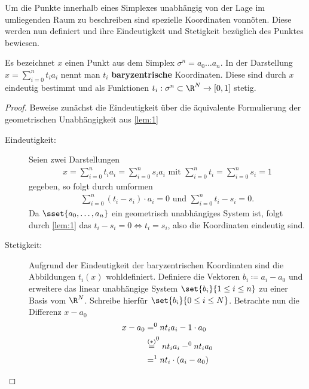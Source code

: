 Um die Punkte innerhalb eines Simplexes unabhängig von der Lage im
umliegenden Raum zu beschreiben sind spezielle Koordinaten
vonnöten. Diese werden nun definiert und ihre Eindeutigkeit und
Stetigkeit bezüglich des Punktes bewiesen.


\begin{Lem}\label{lem:bary}
  \normalfont Es bezeichnet $x$ einen Punkt aus dem Simplex
  $\sigma^n = a_0\ldots a_n$. In der Darstellung
  $x = \sum_{i=0}^n t_i a_i$ nennt man $t_i$ \textbf{baryzentrische}
  Koordinaten. Diese sind durch $x$ eindeutig bestimmt und als
  Funktionen $t_i : \sigma^n \subset \R^N \rightarrow [0,1]$ stetig.
  \begin{proof}
    Beweise zunächst die Eindeutigkeit über die äquivalente
    Formulierung der geometrischen Unabhängigkeit aus \cref{lem:1}
    \begin{description}
    \item[Eindeutigkeit: ] Seien zwei Darstellungen
      \begin{gather*}
        x = \sum\limits_{i=0}^n t_i a_i = \sum\limits_{i=0}^n s_i a_i
        \text{ mit } \sum\limits_{i=0}^n t_i = \sum\limits_{i=0}^n s_i
        = 1
      \end{gather*}
      gegeben, so folgt durch umformen
      \begin{gather*}
        \sum\limits_{i=0}^n (t_i - s_i ) \cdot a_i = 0 \text{ und }
        \sum\limits_{i=0}^n t_i - s_i = 0.
      \end{gather*}
      Da $\sset{a_0 , \ldots , a_n}$ ein geometrisch unabhängiges
      System ist, folgt durch \cref{lem:1} das
      $t_i - s_i = 0 \Leftrightarrow t_i = s_i$, also die Koordinaten
      eindeutig sind.
    \item[Stetigkeit: ] Aufgrund der Eindeutigkeit der baryzentrischen
      Koordinaten sind die Abbildungen $t_i (x)$ wohldefiniert.
      Definiere die Vektoren $b_i \coloneqq a_i - a_0$ und erweitere
      das linear unabhängige System $\set{ b_i }{ 1 \leq i \leq n}$ zu
      einer Basis vom $\R^N$. Schreibe hierfür $\set{ b_i
      }{ 0 \leq i \leq N}$. Betrachte nun die Differenz $x - a_0$
      \begin{align*}
        x - a_0 &= \sp{0}{n} t_i a_i - 1 \cdot a_0\\
                &\overset{(*)}{=} \sp{0}{n} t_i a_i - \sp{0}{n} t_i a_0\\
                &= \sp{1}{n} t_i \cdot (a_i - a_0)\\

\end{align*}
\end{description}
\end{proof}
\end{Lem}
